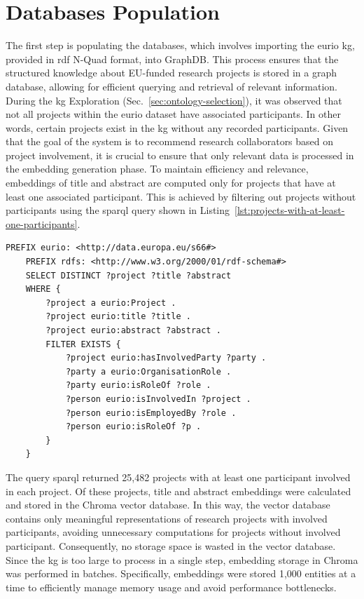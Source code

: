 \section{Databases Population}\label{sec:databases-population}
The first step is populating the databases, which involves importing the \gls{eurio} \gls{kg}, provided in \gls{rdf} N-Quad format, into GraphDB.
This process ensures that the structured knowledge about EU-funded research projects is stored in a graph database, allowing for efficient querying and retrieval of relevant information.
During the \acrlong{kg} Exploration (Sec.~\ref{sec:ontology-selection}), it was observed that not all projects within the \gls{eurio} dataset have associated participants.
In other words, certain projects exist in the \gls{kg} without any recorded participants.
Given that the goal of the system is to recommend research collaborators based on project involvement, it is crucial to ensure that only relevant data is processed in the embedding generation phase.
To maintain efficiency and relevance, embeddings of title and abstract are computed only for projects that have at least one associated participant.
This is achieved by filtering out projects without participants using the \gls{sparql} query shown in Listing~\ref{lst:projects-with-at-least-one-participants}.

\begin{lstlisting}[language=SPARQL, caption={\gls{sparql} query for getting the projects with at least one participant}, label={lst:projects-with-at-least-one-participants}]
    PREFIX eurio: <http://data.europa.eu/s66#>
    PREFIX rdfs: <http://www.w3.org/2000/01/rdf-schema#>
    SELECT DISTINCT ?project ?title ?abstract
    WHERE {
        ?project a eurio:Project .
        ?project eurio:title ?title .
        ?project eurio:abstract ?abstract .
        FILTER EXISTS {
            ?project eurio:hasInvolvedParty ?party .
            ?party a eurio:OrganisationRole .
            ?party eurio:isRoleOf ?role .
            ?person eurio:isInvolvedIn ?project .
            ?person eurio:isEmployedBy ?role .
            ?person eurio:isRoleOf ?p .
        }
    }
\end{lstlisting}

The query \gls{sparql} returned 25,482 projects with at least one participant involved in each project.
Of these projects, title and abstract embeddings were calculated and stored in the Chroma vector database.
In this way, the vector database contains only meaningful representations of research projects with involved participants, avoiding unnecessary computations for projects without involved participant.
Consequently, no storage space is wasted in the vector database.
Since the \gls{kg} is too large to process in a single step, embedding storage in Chroma was performed in batches.
Specifically, embeddings were stored 1,000 entities at a time to efficiently manage memory usage and avoid performance bottlenecks.


